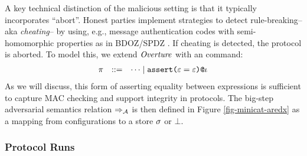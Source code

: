 A key technical distinction of the malicious setting is that it
typically incorporates ``abort''. Honest parties implement strategies
to detect rule-breaking-- aka \emph{cheating}-- by using, e.g.,
message authentication codes with semi-homomorphic properties as in
BDOZ/SPDZ \cite{10.1007/978-3-030-68869-1_3}. If cheating is detected,
the protocol is aborted. To model this, we extend $\mathit{Overture}$ with an
 command:
$$
    \begin{array}{rcl@{\hspace{2mm}}r}
      \prog &::=& \cdots \mid \elab{\assert{\be = \be}}{\cid}
    \end{array}
$$
As we will discuss, this form of asserting equality between expressions
is sufficient to capture MAC checking and support integrity in protocols.
The big-step adversarial semantics relation $\Rightarrow_{\mathcal{A}}$ is then defined
in Figure \ref{fig-minicat-aredx} as a mapping from configurations to
a store $\sigma$ or $\bot$.

\subsubsection{Protocol Runs}

